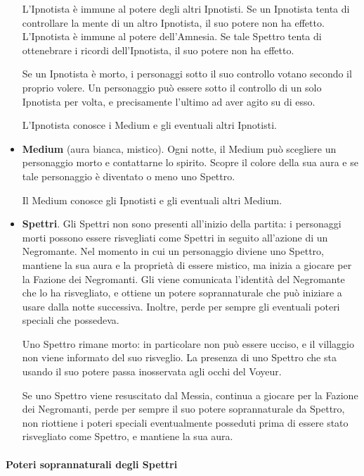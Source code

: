 \documentclass[a4paper,10pt]{article}
\begin{document}
\begin{itemize}
 L'Ipnotista è immune al potere degli altri Ipnotisti. Se un Ipnotista tenta di controllare la mente di un altro Ipnotista, il suo potere non ha effetto.
 L'Ipnotista è immune al potere dell'Amnesia. Se tale Spettro tenta di ottenebrare i ricordi dell'Ipnotista, il suo potere non ha effetto.

 Se un Ipnotista è morto, i personaggi sotto il suo controllo votano secondo il proprio volere.
 Un personaggio può essere sotto il controllo di un solo Ipnotista per volta, e precisamente l'ultimo ad aver agito su di esso.

 L'Ipnotista conosce i Medium e gli eventuali altri Ipnotisti.

 \item {\bf Medium} (aura bianca, mistico). Ogni notte, il Medium può scegliere un personaggio morto e contattarne lo spirito. Scopre il colore della sua aura e se tale personaggio è diventato o meno uno Spettro.

 Il Medium conosce gli Ipnotisti e gli eventuali altri Medium.

 \item {\bf Spettri}. Gli Spettri non sono presenti all'inizio della partita: i personaggi morti possono essere risvegliati come Spettri in seguito all'azione di un Negromante.
 Nel momento in cui un personaggio diviene uno Spettro, mantiene la sua aura e la proprietà di essere mistico, ma inizia a giocare per la Fazione dei Negromanti. Gli viene comunicata l'identità del Negromante che lo ha risvegliato, e ottiene un potere soprannaturale che può iniziare a usare dalla notte successiva. Inoltre, perde per sempre gli eventuali poteri speciali che possedeva.
 
 Uno Spettro rimane morto: in particolare non può essere ucciso, e il villaggio non viene informato del suo risveglio.
 La presenza di uno Spettro che sta usando il suo potere passa inosservata agli occhi del Voyeur.
 
 Se uno Spettro viene resuscitato dal Messia, continua a giocare per la Fazione dei Negromanti, perde per sempre il suo potere soprannaturale da Spettro, non riottiene i poteri speciali eventualmente posseduti prima di essere stato risvegliato come Spettro, e mantiene la sua aura.
 
\end{itemize}


\paragraph{Poteri soprannaturali degli Spettri}
\end{document}
